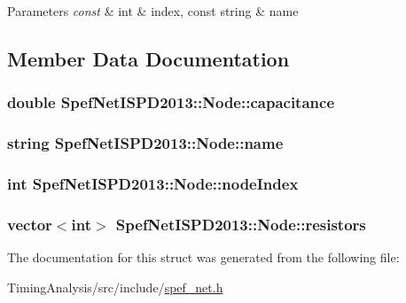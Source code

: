 \begin{DoxyParams}{Parameters}
{\em const} & int \& index, const string \& name \\
\hline
\end{DoxyParams}


\subsection{Member Data Documentation}
\hypertarget{structSpefNetISPD2013_1_1Node_ae5a332384e934554beee8f743670506d}{
\subsubsection[{capacitance}]{\setlength{\rightskip}{0pt plus 5cm}double Spef\-Net\-I\-S\-P\-D2013\-::\-Node\-::capacitance}}\label{structSpefNetISPD2013_1_1Node_ae5a332384e934554beee8f743670506d}
\hypertarget{structSpefNetISPD2013_1_1Node_a7bc1303eeb250a3f7e047b8ec03d5e3e}{
\subsubsection[{name}]{\setlength{\rightskip}{0pt plus 5cm}string Spef\-Net\-I\-S\-P\-D2013\-::\-Node\-::name}}\label{structSpefNetISPD2013_1_1Node_a7bc1303eeb250a3f7e047b8ec03d5e3e}
\hypertarget{structSpefNetISPD2013_1_1Node_ae2b9605ff0872b8b12a8bc27e1a89540}{
\subsubsection[{node\-Index}]{\setlength{\rightskip}{0pt plus 5cm}int Spef\-Net\-I\-S\-P\-D2013\-::\-Node\-::node\-Index}}\label{structSpefNetISPD2013_1_1Node_ae2b9605ff0872b8b12a8bc27e1a89540}
\hypertarget{structSpefNetISPD2013_1_1Node_a0fe85a2441e7652f6a593abd9460ac85}{
\subsubsection[{resistors}]{\setlength{\rightskip}{0pt plus 5cm}vector$<$int$>$ Spef\-Net\-I\-S\-P\-D2013\-::\-Node\-::resistors}}\label{structSpefNetISPD2013_1_1Node_a0fe85a2441e7652f6a593abd9460ac85}


The documentation for this struct was generated from the following file\-:\begin{DoxyCompactItemize}
\item 
Timing\-Analysis/src/include/\hyperlink{spef__net_8h}{spef\-\_\-net.\-h}\end{DoxyCompactItemize}
